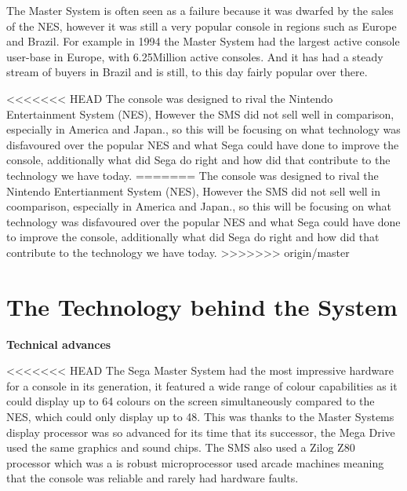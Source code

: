 \documentclass{scrartcl}
\begin{document}
The Master System is often seen as a failure because it was dwarfed by the sales of the NES, however it was still a very popular console in regions such as Europe and Brazil. For example in 1994 the Master System had the largest active console user-base in Europe, with 6.25Million active consoles.\cite{russell} And it has had a steady stream of buyers in Brazil and is still, to this day fairly popular over there.


<<<<<<< HEAD
The console was designed to rival the Nintendo Entertainment System (NES), However the SMS did not sell well in comparison, especially in America and Japan.\cite{Orland}, so this will be focusing on what technology was disfavoured over the popular NES and what Sega could have done to improve the console, additionally what did Sega do right and how did that contribute to the technology we have today.
=======
The console was designed to rival the Nintendo Entertianment System (NES), However the SMS did not sell well in coomparison, especially in America and Japan.\cite{Orland}, so this will be focusing on what technology was disfavoured over the popular NES and what Sega could have done to improve the console, additionally what did Sega do right and how did that contribute to the technology we have today.
>>>>>>> origin/master

\section{The Technology behind the System}

\textbf{Technical advances} \par

<<<<<<< HEAD
The Sega Master System had the most impressive hardware for a console in its generation, it featured a wide range of colour capabilities as it could display up to 64 colours on the screen simultaneously compared to the NES\cite{racket}, which could only display up to 48. This was thanks to the Master Systems display processor was so advanced for its time that its successor, the Mega Drive used the same graphics and sound chips. The SMS also used a Zilog Z80 processor which was a is robust microprocessor used arcade machines meaning that the console was reliable and rarely had hardware faults.\cite{russell} 
\end{document}
